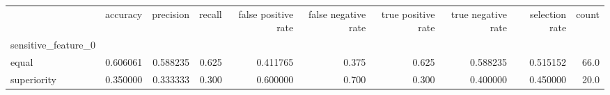 \begin{tabular}{lrrrrrrrrr}
\toprule
{} &  accuracy &  precision &  recall &  false positive rate &  false negative rate &  true positive rate &  true negative rate &  selection rate &  count \\
sensitive\_feature\_0 &           &            &         &                      &                      &                     &                     &                 &        \\
\midrule
equal               &  0.606061 &   0.588235 &   0.625 &             0.411765 &                0.375 &               0.625 &            0.588235 &        0.515152 &   66.0 \\
superiority         &  0.350000 &   0.333333 &   0.300 &             0.600000 &                0.700 &               0.300 &            0.400000 &        0.450000 &   20.0 \\
\bottomrule
\end{tabular}

